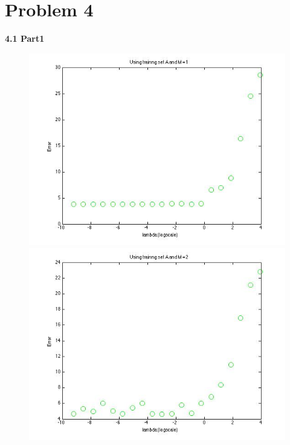 \section{Problem 4}

{\bfseries 4.1 Part1}

\begin{figure}[!htb]
  \includegraphics[width=\linewidth]{figures/p4_LAD_regressA_m=1}
\endminipage\hfill
{}
  \includegraphics[width=\linewidth]{figures/p4_LAD_regressA_m=2}
\endminipage\hfill

\end{figure}
